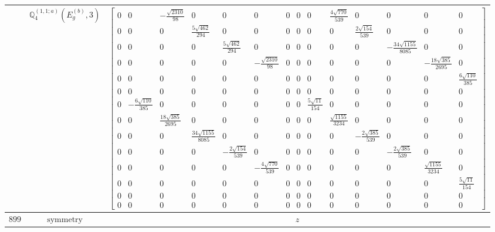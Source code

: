 \documentclass[fleqn,8pt,landscape]{jsarticle}
\begin{document}
\begin{longtable}{ccc}
$  $ & $ \mathbb{Q}_{4}^{(1,1;a)}(E_{g}^{(b)},3) $ & $ \begin{bmatrix} 0 & 0 & - \frac{\sqrt{2310}}{98} & 0 & 0 & 0 & 0 & 0 & 0 & \frac{4 \sqrt{770}}{539} & 0 & 0 & 0 & 0 \\ 0 & 0 & 0 & \frac{5 \sqrt{462}}{294} & 0 & 0 & 0 & 0 & 0 & 0 & \frac{2 \sqrt{154}}{539} & 0 & 0 & 0 \\ 0 & 0 & 0 & 0 & \frac{5 \sqrt{462}}{294} & 0 & 0 & 0 & 0 & 0 & 0 & - \frac{34 \sqrt{1155}}{8085} & 0 & 0 \\ 0 & 0 & 0 & 0 & 0 & - \frac{\sqrt{2310}}{98} & 0 & 0 & 0 & 0 & 0 & 0 & - \frac{18 \sqrt{385}}{2695} & 0 \\ 0 & 0 & 0 & 0 & 0 & 0 & 0 & 0 & 0 & 0 & 0 & 0 & 0 & \frac{6 \sqrt{110}}{385} \\ 0 & 0 & 0 & 0 & 0 & 0 & 0 & 0 & 0 & 0 & 0 & 0 & 0 & 0 \\ 0 & - \frac{6 \sqrt{110}}{385} & 0 & 0 & 0 & 0 & 0 & 0 & \frac{5 \sqrt{11}}{154} & 0 & 0 & 0 & 0 & 0 \\ 0 & 0 & \frac{18 \sqrt{385}}{2695} & 0 & 0 & 0 & 0 & 0 & 0 & \frac{\sqrt{1155}}{3234} & 0 & 0 & 0 & 0 \\ 0 & 0 & 0 & \frac{34 \sqrt{1155}}{8085} & 0 & 0 & 0 & 0 & 0 & 0 & - \frac{2 \sqrt{385}}{539} & 0 & 0 & 0 \\ 0 & 0 & 0 & 0 & - \frac{2 \sqrt{154}}{539} & 0 & 0 & 0 & 0 & 0 & 0 & - \frac{2 \sqrt{385}}{539} & 0 & 0 \\ 0 & 0 & 0 & 0 & 0 & - \frac{4 \sqrt{770}}{539} & 0 & 0 & 0 & 0 & 0 & 0 & \frac{\sqrt{1155}}{3234} & 0 \\ 0 & 0 & 0 & 0 & 0 & 0 & 0 & 0 & 0 & 0 & 0 & 0 & 0 & \frac{5 \sqrt{11}}{154} \\ 0 & 0 & 0 & 0 & 0 & 0 & 0 & 0 & 0 & 0 & 0 & 0 & 0 & 0 \\ 0 & 0 & 0 & 0 & 0 & 0 & 0 & 0 & 0 & 0 & 0 & 0 & 0 & 0 \end{bmatrix} $ \\ \hline
$ 899 $ & $ \text{symmetry} $ & $ z $ \\

\end{longtable}
\end{document}
